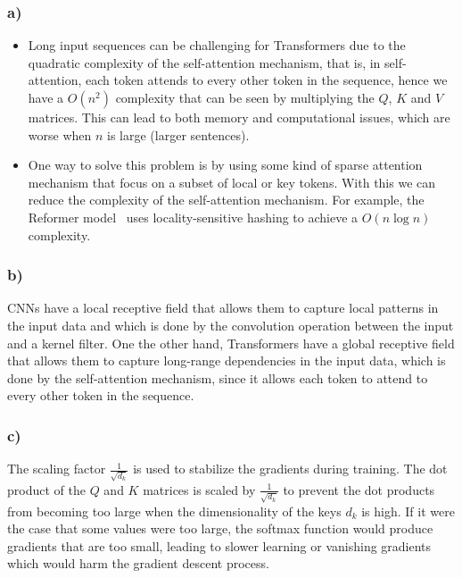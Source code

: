 \documentclass{article}
\begin{document}
\subsubsection*{a)}

\begin{itemize}
    \item Long input sequences can be challenging for Transformers due to the quadratic complexity of the self-attention mechanism, 
    that is, in self-attention, each token attends to every other token in the sequence, hence we have a  
    $O(n^2)$ complexity that can be seen by multiplying the $Q$, $K$ and $V$ matrices. This can lead to both memory
    and computational issues, which are worse when $n$ is large (larger sentences).

    \item One way to solve this problem is by using some kind of sparse attention mechanism that focus on a subset
of local or key tokens. With this we can reduce the complexity of the self-attention mechanism. For example,
the Reformer model~ %
 uses locality-sensitive hashing to achieve a $O(n \log n)$ complexity.
\end{itemize}

\subsubsection*{b)}

CNNs have a local receptive field that allows them to capture local patterns in the input data and which is done
by the convolution operation between the input and a kernel filter. One the other hand, Transformers have a global
receptive field that allows them to capture long-range dependencies in the input data, which is done by the self-attention
mechanism, since it allows each token to attend to every other token in the sequence.

\subsubsection*{c)}

The scaling factor $\frac{1}{\sqrt{d_k}}$ is used to stabilize the gradients during training. The dot product of the
$Q$ and $K$ matrices is scaled by $\frac{1}{\sqrt{d_k}}$ to prevent the dot products from becoming too large when the
dimensionality of the keys $d_k$ is high. If it were the case that some values were too large, the softmax function would
produce gradients that are too small, leading to slower learning or vanishing gradients which would harm the gradient descent process.
\end{document}
